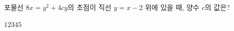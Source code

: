 포물선 $8x=y^2+4cy$의 초점이 직선 $y=x-2$ 위에 있을 때, 양수 $c$의 값은?
\begin{choices32}{$1$}{$2$}{$3$}{$4$}{$5$}\end{choices32}

